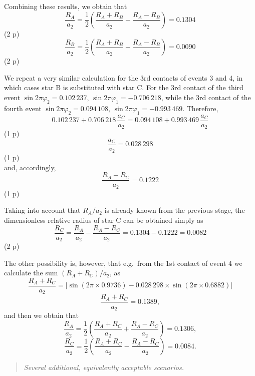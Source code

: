 \begin{description}
\begin{description}
    Combining these results, we obtain that
    \[ \frac{R_A}{a_2} = \frac{1}{2}\left( \frac{R_A + R_B}{a_2}
       + \frac{R_A - R_B}{a_2} \right) = 0.1304
       \tag*{(2.17)} \]
    \hfill(2 p)
    \[ \frac{R_B}{a_2} = \frac{1}{2}\left( \frac{R_A + R_B}{a_2}
       - \frac{R_A - R_B}{a_2} \right) = 0.0090
       \tag*{(2.18)} \]
    \hfill(2 p)

    We repeat a very similar calculation for the 3rd contacts of events 3
    and 4, in which cases star B is substituted with star C. For the 3rd
    contact of the third event $\sin 2\pi\varphi_2 = 0.102\,237$,
    $\sin 2\pi\varphi_1 = -0.706\,218$, while the 3rd contact of the fourth
    event $\sin 2\pi\varphi_2 = 0.094\,108$,
    $\sin 2\pi\varphi_1 = -0.993\,469$. Therefore,
    \[ 0.102\,237 + 0.706\,218\,\frac{a_C}{a_2}
       = 0.094\,108 + 0.993\,469\,\frac{a_C}{a_2}
       \tag*{(2.19)} \]
    \hfill(1 p)
    \[ \frac{a_C}{a_2} = 0.028\,298
       \tag*{(2.20)} \]
    \hfill(1 p)\\
    and, accordingly,
    \[ \frac{R_A - R_C}{a_2} = 0.1222
       \tag*{(2.21)} \]
    \hfill(1 p)

    Taking into account that $R_A/a_2$ is already known from the previous
    stage, the dimensionless relative radius of star C can be obtained
    simply as
    \[ \frac{R_C}{a_2} = \frac{R_A}{a_2} - \frac{R_A - R_C}{a_2}
       = 0.1304 - 0.1222 = 0.0082
       \tag*{(2.22)} \]
    \hfill(2 p)

    The other possibility is, however, that e.g.\ from the 1st contact of
    event 4 we calculate the sum $(R_A + R_C)/a_2$, as
    \[ \frac{R_A + R_C}{a_2}
       = \left| \sin(2\pi \times 0.9736)
       - 0.028\,298 \times \sin(2\pi \times 0.6882) \right|
       \tag*{(2.23)} \]
    \[ \frac{R_A + R_C}{a_2} = 0.1389,
       \tag*{(2.24)} \]
    and then we obtain that
    \[ \frac{R_A}{a_2} = \frac{1}{2}\left( \frac{R_A + R_C}{a_2}
       + \frac{R_A - R_C}{a_2} \right) = 0.1306,
       \tag*{(2.25)} \]
    \[ \frac{R_C}{a_2} = \frac{1}{2}\left( \frac{R_A + R_C}{a_2}
       - \frac{R_A - R_C}{a_2} \right) = 0.0084.
       \tag*{(2.26)} \]

    \begin{quote}
    \emph{Several additional, equivalently acceptable scenarios.}


\end{quote}
\end{description}
\end{description}
